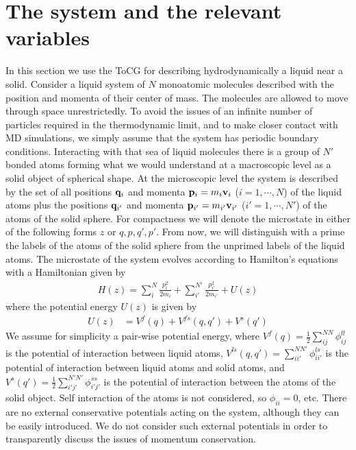 \documentclass[b5paper,openright,10pt]{book}
\begin{document}
\section{The system and the relevant variables}
In this section we use the ToCG for describing hydrodynamically a liquid near a solid. 
Consider a liquid system of $N$ monoatomic molecules described
with the position and momenta of  their center of mass.  The molecules
are allowed to move through  space unrestrictedly. To avoid the issues
of  an infinite  number  of particles  required  in the  thermodynamic
limit, and to make closer contact with MD simulations,
we simply  assume that  the system  has periodic  boundary conditions.
Interacting with that sea of liquid molecules there is a group of $N'$
bonded atoms forming  what we would understand at a macroscopic level
as a solid object of spherical shape. 
At the microscopic level the system is described  by the set of all  positions  ${\bf  q}_i$  and  momenta  ${\bf  p}_i=m_i{\bf  v}_i$
($i=1,\cdots,N$) of the liquid atoms plus the positions ${\bf q}_{i'}$
and  momenta ${\bf  p}_{i'}=m_{i'}{\bf v}_{i'}$  ($i'=1,\cdots,N'$) of
the atoms  of the solid  sphere.  For  compactness we will  denote the
microstate in either  of the following forms $z$  or ${q,p,q',p'}$. From now, we
will distinguish  with a prime  the labels of  the atoms of  the solid
sphere from the  unprimed labels of the liquid  atoms.  The microstate
of  the  system  evolves  according to  Hamilton's  equations  with  a
Hamiltonian given by
\begin{eqnarray}
H(z) = \sum^N_i \frac{p_i^2}{2m_i} + \sum^{N'}_{i'} \frac{p_{i'}^2}{2m_{i'}}
+ U(z)
\label{H}
\end{eqnarray}
where the potential energy $U(z)$ is given by
\begin{align}
U(z)&=  V^{f}(q)+ V^{fs}(q,q')+ V^{s}(q')
\end{align}
We  assume   for  simplicity  a  pair-wise   potential  energy,  where
$V^{f}(q)=\frac{1}{2}\sum^{{NN}}_{i   j}\phi^{ll}_{ij}$   is   the
potential  of  interaction  between   liquid  atoms,  $  V^{ls}(q,q')=
\sum^{NN'}_{ii'}\phi^{ls}_{ii'}$  is  the   potential  of  interaction
between   liquid   atoms   and   solid   atoms,   and   $   V^{s}(q')=
\frac{1}{2}\sum^{{N'N'}}_{i' j'}\phi^{ss}_{i'j'}$ is the potential
of  interaction  between   the  atoms  of  the   solid  object.   Self
interaction of  the atoms  is not  considered, so  $\phi_{ii}=0$, etc.
There are  no external conservative  potentials acting on  the system,
although  they can  be  easily  introduced. We  do  not consider  such
external potentials  in order to  transparently discuss the  issues of
momentum conservation.
\end{document}
